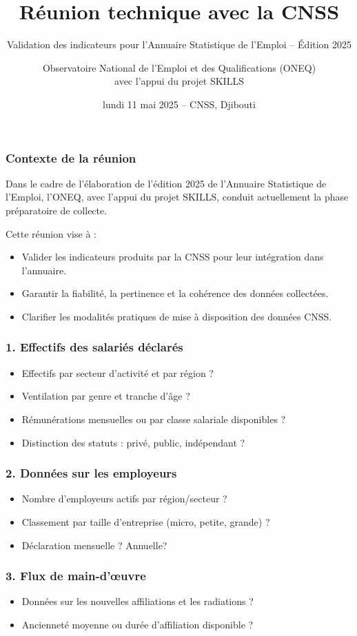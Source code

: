 \documentclass{beamer}
\title{Réunion technique avec la CNSS}
\subtitle{Validation des indicateurs pour l’Annuaire Statistique de l’Emploi – Édition 2025}
\author{Observatoire National de l’Emploi et des Qualifications (ONEQ)\\avec l’appui du projet SKILLS}
\date{lundi 11 mai 2025 – CNSS, Djibouti}
\begin{document}
\frame{\titlepage}

\begin{frame}
\frametitle{Contexte de la réunion}
Dans le cadre de l’élaboration de l’édition 2025 de l’Annuaire Statistique de l’Emploi, l’ONEQ, avec l’appui du projet SKILLS, conduit actuellement la phase préparatoire de collecte.

\medskip
Cette réunion vise à :
\begin{itemize}
  \item Valider les indicateurs produits par la CNSS pour leur intégration dans l’annuaire.
  \item Garantir la fiabilité, la pertinence et la cohérence des données collectées.
  \item Clarifier les modalités pratiques de mise à disposition des données CNSS.
\end{itemize}
\end{frame}

\begin{frame}
\frametitle{1. Effectifs des salariés déclarés}
\begin{itemize}
  \item Effectifs par secteur d’activité et par région ?
  \item Ventilation par genre et tranche d’âge ?
  \item Rémunérations mensuelles ou par classe salariale disponibles ?
  \item Distinction des statuts : privé, public, indépendant ?
\end{itemize}
\end{frame}

\begin{frame}
\frametitle{2. Données sur les employeurs}
\begin{itemize}
  \item Nombre d’employeurs actifs par région/secteur ?
  \item Classement par taille d’entreprise (micro, petite, grande) ?
  \item Déclaration mensuelle ? Annuelle?
\end{itemize}
\end{frame}

\begin{frame}
\frametitle{3. Flux de main-d’œuvre}
\begin{itemize}
  \item Données sur les nouvelles affiliations et les radiations ?
  \item Ancienneté moyenne ou durée d’affiliation disponible ?
\end{itemize}
\end{frame}
\end{document}
